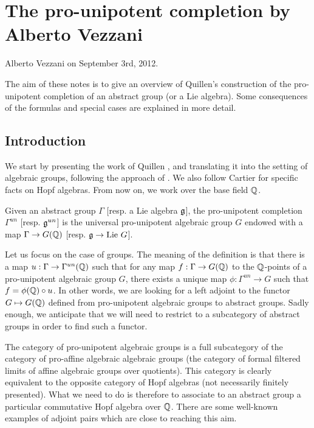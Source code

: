\chapter*{The pro-unipotent completion by Alberto Vezzani}

Alberto Vezzani on September 3rd, 2012.

\medskip
\medskip

The aim of these notes is to give an overview of Quillen's construction of the pro-unipotent completion of an abstract group (or a Lie algebra). Some consequences of the formulas and special cases are explained in more detail.

\section{Introduction}

We start by presenting the work of Quillen \cite[Appendix A]{quillen-r}, and translating it into the setting of algebraic groups, following the approach of \cite{em}. We also follow Cartier \cite{cartier-ha} for specific facts on Hopf algebras.
From now on, we work over the base field $\mathbb{Q}$. %

\begin{defn}
Given an abstract group $\Gamma$ [resp. a Lie algebra $\mathfrak{g}$], the pro-unipotent completion $\Gamma^{un}$ [resp. $\mathfrak{g}^{un}$] is the universal pro-unipotent algebraic group $G$ endowed with a map $\Gamma\to G(\mathbb{Q})$ [resp. $\mathfrak{g} \to \mathrm{Lie~}G$]. 
\end{defn}

Let us focus on the case of groups. The meaning of the definition is that there is a map $u:\Gamma\to\Gamma^{un}(\mathbb{Q})$ such that for any map $f:\Gamma\to G(\mathbb{Q})$ to the $\mathbb{Q}$-points of a pro-unipotent algebraic group $G$, there exists a unique map $\phi:\Gamma^{un}\to G$ such that $f=\phi(\mathbb{Q})\circ u$. In other words, we are looking for a left adjoint to the functor $G\mapsto G(\mathbb{Q})$ defined from pro-unipotent algebraic groups to abstract groups. Sadly enough, we anticipate that we will need to restrict to a subcategory of abstract groups in order to find such a functor.

The category of pro-unipotent algebraic groups is a full subcategory of the category of pro-affine algebraic algebraic groups (the category of formal filtered limits of affine algebraic groups over quotients). This category is clearly equivalent to the opposite category of Hopf algebras (not necessarily finitely presented). What we need to do is therefore to associate to an abstract group a particular commutative Hopf algebra over $\mathbb{Q}$. There are some well-known examples of adjoint pairs which are close to reaching this aim.

